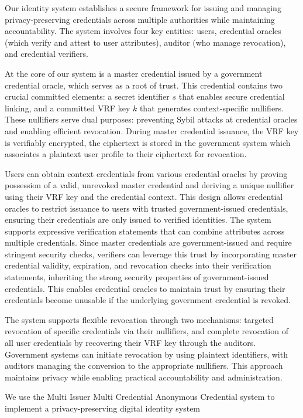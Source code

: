 Our identity system establishes a secure framework for issuing and managing privacy-preserving credentials across multiple authorities while maintaining accountability. The system involves four key entities: users, credential oracles (which verify and attest to user attributes), auditor (who manage revocation), and credential verifiers.

\noindent At the core of our system is a master credential issued by a government credential oracle, which serves as a root of trust. This credential contains two crucial committed elements: a secret identifier $s$ that enables secure credential linking, and a committed VRF key $k$ that generates context-specific nullifiers. These nullifiers serve dual purposes: preventing Sybil attacks at credential oracles and enabling efficient revocation. During master credential issuance, the VRF key is verifiably encrypted, the ciphertext is stored in the government system which associates a plaintext user profile to their ciphertext for revocation.


\noindent Users can obtain context credentials from various credential oracles by proving possession of a valid, unrevoked master credential and deriving a unique nullifier using their VRF key and the credential context. This design allows credential oracles to restrict issuance to users with trusted government-issued credentials, ensuring their credentials are only issued to verified identities. The system supports expressive verification statements that can combine attributes across multiple credentials. Since master credentials are government-issued and require stringent security checks, verifiers can leverage this trust by incorporating master credential validity, expiration, and revocation checks into their verification statements, inheriting the strong security properties of government-issued credentials. This enables credential oracles to maintain trust by ensuring their credentials become unusable if the underlying government credential is revoked.


\noindent The system supports flexible revocation through two mechanisms: targeted revocation of specific credentials via their nullifiers, and complete revocation of all user credentials by recovering their VRF key through the auditors. Government systems can initiate revocation by using plaintext identifiers, with auditors managing the conversion to the appropriate nullifiers. This approach maintains privacy while enabling practical accountability and administration.

We use the Multi Issuer Multi Credential Anonymous Credential system to implement a privacy-preserving digital identity system

